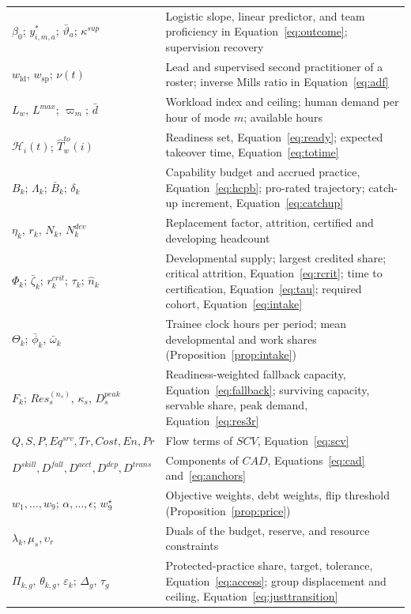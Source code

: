 \documentclass[utf8]{frontiers_suppmat}
\begin{document}
\begin{table}[!htbp]
\begin{tabularx}{\textwidth}{lX}
		$\beta_0$; $y^{\ast}_{i,m,a}$; $\bar\vartheta_a$; $\kappa^{sup}$ & Logistic slope, linear predictor, and team proficiency in Equation~\eqref{eq:outcome}; supervision recovery\\
		$w_{\mathrm{ld}}$, $w_{\mathrm{sp}}$; $\nu(t)$ & Lead and supervised second practitioner of a roster; inverse Mills ratio in Equation~\eqref{eq:adf}\\
		$L_w$, $L^{max}$; $\varpi_m$; $\bar d$ & Workload index and ceiling; human demand per hour of mode $m$; available hours\\
		$\mathcal{H}_i(t)$; $\hat T^{to}_w(i)$ & Readiness set, Equation~\eqref{eq:ready}; expected takeover time, Equation~\eqref{eq:totime}\\
		$B_k$; $\Lambda_k$; $\bar B_k$; $\delta_k$ & Capability budget and accrued practice, Equation~\eqref{eq:hcpb}; pro-rated trajectory; catch-up increment, Equation~\eqref{eq:catchup}\\
		$\eta_k$, $r_k$, $N_k$, $N^{dev}_k$ & Replacement factor, attrition, certified and developing headcount\\
		$\Phi_k$; $\bar\zeta_k$; $r^{crit}_k$; $\tau_k$; $\hat n_k$ & Developmental supply; largest credited share; critical attrition, Equation~\eqref{eq:rcrit}; time to certification, Equation~\eqref{eq:tau}; required cohort, Equation~\eqref{eq:intake}\\
		$\Theta_k$; $\bar\phi_k$, $\bar\omega_k$ & Trainee clock hours per period; mean developmental and work shares (Proposition~\ref{prop:intake})\\
		$F_k$; $Res^{(n_s)}_s$, $\kappa_s$, $D^{peak}_s$ & Readiness-weighted fallback capacity, Equation~\eqref{eq:fallback}; surviving capacity, servable share, peak demand, Equation~\eqref{eq:res3r}\\
		$Q,S,P,Eq^{srv},Tr,Cost,En,Pr$ & Flow terms of $SCV$, Equation~\eqref{eq:scv}\\
		$D^{skill},D^{fall},D^{acct},D^{dep},D^{trans}$ & Components of $CAD$, Equations~\eqref{eq:cad} and~\eqref{eq:anchors}\\
		$w_1,\ldots,w_9$; $\alpha,\ldots,\epsilon$; $w_9^\star$ & Objective weights, debt weights, flip threshold (Proposition~\ref{prop:price})\\
		$\lambda_k,\mu_s,\upsilon_r$ & Duals of the budget, reserve, and resource constraints\\
		$\Pi_{k,g}$, $\theta_{k,g}$, $\varepsilon_k$; $\Delta_g$, $\tau_g$ & Protected-practice share, target, tolerance, Equation~\eqref{eq:access}; group displacement and ceiling, Equation~\eqref{eq:justtransition}\\
		\bottomrule
	\end{tabularx}
\end{table}
\end{document}
